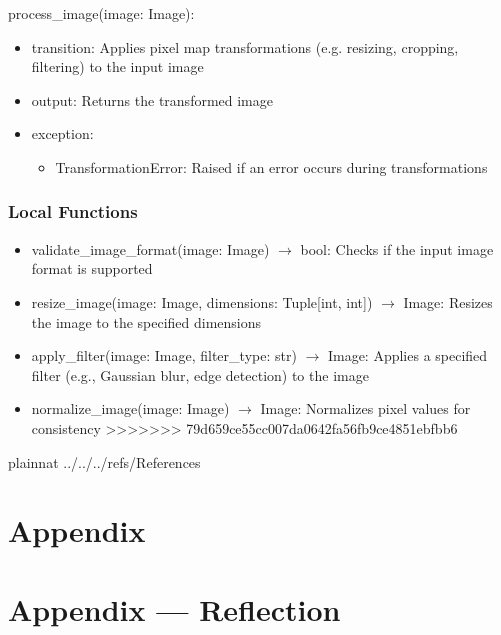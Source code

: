 \documentclass[12pt, titlepage]{article}
\begin{document}
\begin{itemize}
\begin{itemize}
\end{itemize}
\noindent process{\_}image(image: Image):
\begin{itemize}
  \item transition: Applies pixel map transformations (e.g. resizing, cropping, filtering) to the input image
  \item output: Returns the transformed image
  \item exception: 
  \begin{itemize}
    \item TransformationError: Raised if an error occurs during transformations
  \end{itemize}
  
  \end{itemize}

\subsubsection{Local Functions}

\begin{itemize}
  \item validate{\_}image{\_}format(image: Image) $\rightarrow$ bool: Checks if the input image format is supported
  \item resize{\_}image(image: Image, dimensions: Tuple[int, int]) $\rightarrow$ Image: Resizes the image to the specified dimensions
  \item apply{\_}filter(image: Image, filter{\_}type: str) $\rightarrow$ Image: Applies a specified filter (e.g., Gaussian blur, edge detection) to the image
  \item normalize{\_}image(image: Image) $\rightarrow$ Image: Normalizes pixel values for consistency
>>>>>>> 79d659ce55cc007da0642fa56fb9ce4851ebfbb6
\end{itemize}

\newpage

 {plainnat}
 {../../../refs/References}


\newpage

\section{Appendix} \label{Appendix}


\newpage{}

\section*{Appendix --- Reflection}


\end{itemize}
\end{document}
